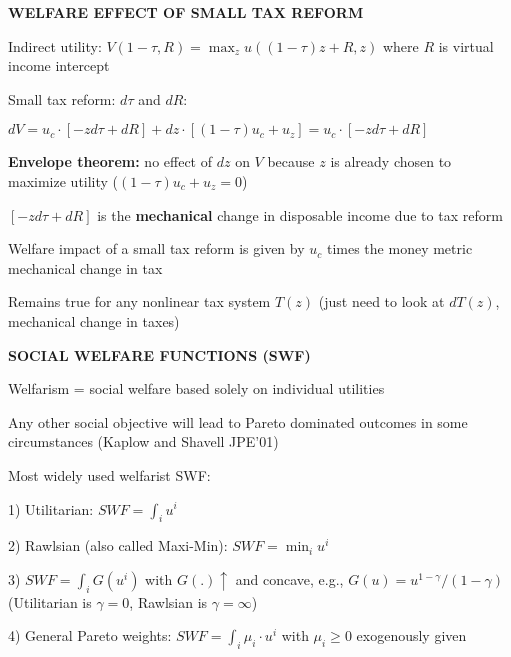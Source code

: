 \documentclass[landscape]{slides}
\begin{document}
\begin{slide}
\begin{center}
{\bf WELFARE EFFECT OF SMALL TAX REFORM}
\end{center}
Indirect utility: $V(1-\tau,R)=\max_z u((1-\tau)z+R,z)$ where $R$
is virtual income intercept

Small tax reform: $d\tau$ and $dR$:

$dV=u_c \cdot [-z d\tau + dR ] + dz \cdot [(1-\tau)u_c+u_z] = u_c \cdot [-z d\tau + dR ]$

\textbf{Envelope theorem:} no effect of $dz$ on $V$ because $z$ is already chosen
to maximize utility ($(1-\tau)u_c+u_z=0$)

$[-z d\tau + dR]$ is the \textbf{mechanical} change in disposable income due to tax reform


Welfare impact of a small tax reform is given by $u_c$ times the money metric
mechanical change in tax

Remains true for any nonlinear tax system $T(z)$ (just need to look at $dT(z)$, mechanical change
in taxes)
\end{slide}

\begin{slide}
\begin{center}
{\bf SOCIAL WELFARE FUNCTIONS (SWF)}
\end{center}
Welfarism = social welfare based solely on individual utilities

\small
Any other social objective will lead to Pareto dominated outcomes in some
circumstances (Kaplow and Shavell JPE'01)
\normalsize

Most widely used welfarist SWF:

1) Utilitarian: $SWF = \int_i u^i$

2) Rawlsian (also called Maxi-Min): $SWF=\min_i u^i$

3) $SWF= \int_i G(u^i)$ with $G(.) \uparrow$  and concave, e.g., $G(u)=u^{1-\gamma}/(1-\gamma)$ 
(Utilitarian is $\gamma=0$, Rawlsian is $\gamma=\infty$)

4) General Pareto weights: $SWF=\int_i \mu_i \cdot u^i$ with $\mu_i \geq 0$ exogenously given


\end{slide}
\end{document}
